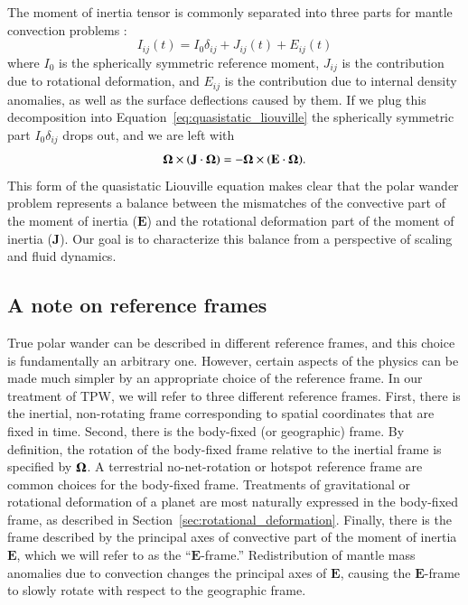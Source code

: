 \documentclass[preprint,12pt,authoryear]{elsarticle}
\newcommand{\mitbf}[1]{\hbox{\mathversion{bold}$#1$}}
\begin{document}
The moment of inertia tensor is commonly separated into three parts for mantle convection problems \citep{sabadini1981pleistocene, spada1992excitation}:
\begin{equation}
I_{ij}(t) = I_0 \delta_{ij} + J_{ij}(t) + E_{ij}(t)
\label{eq:separation}
\end{equation}
where $I_0$ is the spherically symmetric reference moment, $J_{ij}$ is the contribution due to rotational deformation, and $E_{ij}$ is the contribution due to internal density anomalies, as well as the surface deflections caused by them.
If we plug this decomposition into Equation~\eqref{eq:quasistatic_liouville} the spherically symmetric part $I_0 \delta_{ij}$ drops out, and we are left with
\begin{equation}
\mathbf{\Omega} \times (\mathbf{J} \cdot \mitbf{\Omega}) = -\mitbf{\Omega} \times ( \mathbf{E} \cdot \mitbf{\Omega} ).
\label{eq:disequilibrium}
\end{equation}
This form of the quasistatic Liouville equation makes clear that the polar wander problem represents a balance between the mismatches
of the convective part of the moment of inertia ($\mathbf{E}$) and the rotational deformation part of the moment of inertia ($\mathbf{J}$).
Our goal is to characterize this balance from a perspective of scaling and fluid dynamics.

\subsection{A note on reference frames}
\label{sec:reference_frames}
True polar wander can be described in different reference frames, and this choice is fundamentally an arbitrary one.
However, certain aspects of the physics can be made much simpler by an appropriate choice of the reference frame.
In our treatment of TPW, we will refer to three different reference frames.  First, there is the inertial, non-rotating frame corresponding to spatial coordinates that are fixed in time.
 Second, there is the body-fixed (or geographic) frame.
By definition, the rotation of the body-fixed frame relative to the inertial frame is specified by $\mitbf{\Omega}$.
A terrestrial no-net-rotation or hotspot reference frame are common choices for the body-fixed frame.
Treatments of gravitational or rotational deformation of a planet are most naturally expressed in the body-fixed frame,
as described in Section~\ref{sec:rotational_deformation}.
 Finally, there is the frame described by the principal axes of convective part of the moment of inertia $\mathbf{E}$,
which we will refer to as the ``$\mathbf{E}$-frame.'' 
Redistribution of mantle mass anomalies due to convection changes the principal axes of $\mathbf{E}$, 
causing the $\mathbf{E}$-frame to slowly rotate with respect to the geographic frame. 
\end{document}
